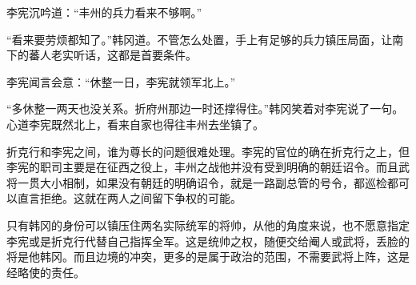 李宪沉吟道：“丰州的兵力看来不够啊。”

“看来要劳烦都知了。”韩冈道。不管怎么处置，手上有足够的兵力镇压局面，让南下的蕃人老实听话，这都是首要条件。

李宪闻言会意：“休整一日，李宪就领军北上。”

“多休整一两天也没关系。折府州那边一时还撑得住。”韩冈笑着对李宪说了一句。心道李宪既然北上，看来自家也得往丰州去坐镇了。

折克行和李宪之间，谁为尊长的问题很难处理。李宪的官位的确在折克行之上，但李宪的职司主要是在征西之役上，丰州之战他并没有受到明确的朝廷诏令。而且武将一贯大小相制，如果没有朝廷的明确诏令，就是一路副总管的号令，都巡检都可以直言拒绝。这就在两人之间留下争权的可能。

只有韩冈的身份可以镇压住两名实际统军的将帅，从他的角度来说，也不愿意指定李宪或是折克行代替自己指挥全军。这是统帅之权，随便交给阉人或武将，丢脸的将是他韩冈。而且边境的冲突，更多的是属于政治的范围，不需要武将上阵，这是经略使的责任。

